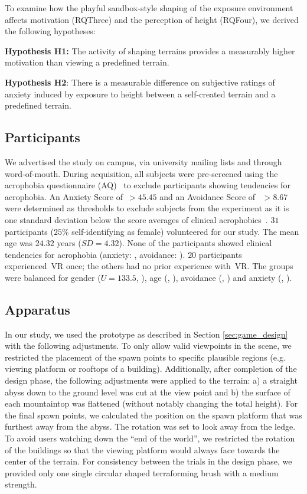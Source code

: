 To examine how the playful sandbox-style shaping of the exposure environment affects motivation (\acl{RQThree}) and the perception of height (\acl{RQFour}), we derived the following hypotheses:

\textbf{Hypothesis H1:} The activity of shaping terrains provides a measurably higher motivation than viewing a predefined terrain.

\textbf{Hypothesis H2}: There is a measurable difference on subjective ratings of anxiety induced by exposure to height between a self-created terrain and a predefined terrain.

\subsection{Participants}
We advertised the study on %
campus, via university mailing lists and through word-of-mouth.
During acquisition, all subjects were pre-screened using the acrophobia questionnaire (AQ)~\cite{cohen1977} to exclude participants showing tendencies for acrophobia. An Anxiety Score of~${>}45.45$ and an Avoidance Score of ~${>}8.67$ were determined as thresholds to exclude subjects from the experiment as it is one standard deviation below the score averages of clinical acrophobics~\cite{cohen1977,antony2005}.
$31$ participants ($25\%$ self-identifying as female) volunteered for our study. The mean age was $24.32$ years ($SD{=}4.32$).
None of the participants showed clinical tendencies for acrophobia (anxiety: , avoidance: ). $20$ participants experienced~\ac{VR} once; the others had no prior experience with~\ac{VR}. The groups were balanced for gender ($U{=}133.5$, ), age (, ), avoidance (, ) and anxiety (, ).

\subsection{Apparatus}
In our study, we used the prototype as described in Section \ref{sec:game_design} with the following adjustments.
To only allow valid viewpoints in the scene, we restricted the placement of the spawn points to %
specific %
plausible regions (e.g. viewing platform or rooftops of a building).
Additionally, after completion of the design phase, the following adjustments were applied to the terrain: a) a straight abyss down to the ground level was cut at the view point and b) the surface of each mountaintop was flattened (without notably changing the total height). For the final spawn points, we calculated the position on the spawn platform that was furthest away from the abyss. The rotation was set to look away from the ledge.
To avoid users watching down the ``end of the world'', we restricted the rotation of the buildings so that the viewing platform would always face towards the center of the terrain.
For consistency between the trials in the design phase, we provided only one single circular shaped terraforming brush with a medium strength. 

